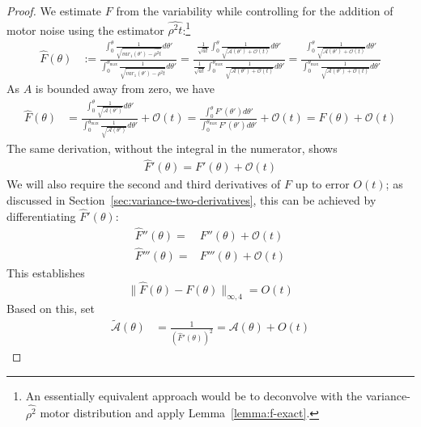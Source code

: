 \begin{proof}
We estimate $F$ from the variability while controlling for the addition of motor noise using the estimator $\widehat{\rho^2t}$:\footnote{An essentially equivalent approach would be to deconvolve with the variance-$\widehat{\rho^2}$ motor distribution and apply Lemma~\ref{lemma:f-exact}.}
    \begin{align*}
        \widehat{F}(\theta) & := \frac{\int_{0}^{\theta}\frac{1}{\sqrt{var_1(\theta') - \widehat{\rho^2t}}} d \theta'}{\int_{0}^{\theta_{\max}}\frac{1}{\sqrt{var_1(\theta') - \widehat{\rho^2t}}}d \theta'} 
        = \frac{\frac{1}{\sqrt{at}}\int_{0}^{\theta}\frac{1}{\sqrt{\mathcal{A}(\theta') + \mathcal{O}(t)}}d \theta'}{\frac{1}{\sqrt{at}}\int_{0}^{\theta_{\max}}\frac{1}{\sqrt{\mathcal{A}(\theta') + \mathcal{O}(t)}}d \theta'}
        = \frac{\int_{0}^{\theta}\frac{1}{\sqrt{\mathcal{A}(\theta') + \mathcal{O}(t)}} d \theta'}{\int_{0}^{\theta_{\max}}\frac{1}{\sqrt{\mathcal{A}(\theta') + \mathcal{O}(t)}}d \theta'}
        \end{align*}
        As $A$ is bounded away from zero, we have
        \begin{align*}
             \widehat{F}(\theta) & =    \frac{\int_{0}^{\theta}\frac{1}{\sqrt{\mathcal{A}(\theta')}} d \theta'}{\int_{0}^{\theta_{\max}}\frac{1}{\sqrt{\mathcal{A}(\theta')}}d \theta'} + \mathcal{O}(t) 
           =    \frac{\int_{0}^{\theta} F'(\theta') d \theta'}{\int_{0}^{\theta_{\max}} F'(\theta') d \theta'} + \mathcal{O}(t) 
           = F(\theta)  + \mathcal{O}(t)
        \end{align*}
The same derivation, without the integral in the numerator, shows
\begin{align*}
    \widehat{F}'(\theta)  = F'(\theta)  + \mathcal{O}(t)
\end{align*}
We will also require the second and third derivatives of $F$ up to error $O(t)$; as discussed in Section~\ref{sec:variance-two-derivatives}, this can be achieved by differentiating $\widehat{F}'(\theta)$:
\begin{align*}
    \widehat{F}''(\theta)  =& F''(\theta)  + \mathcal{O}(t) \\
    \widehat{F}'''(\theta)  =& F'''(\theta)  + \mathcal{O}(t) 
\end{align*}
This establishes
\begin{equation}
        \|\widehat{F}(\theta) - F(\theta)\|_{\infty,4} = O(t)
\end{equation}
Based on this, set
    \begin{align*}
        \tilde{\mathcal{A}}(\theta) &= \frac{1}{\left(\widehat{F}'(\theta)\right)^2} = \mathcal{A}(\theta) + O(t)

\end{align*}
\end{proof}
